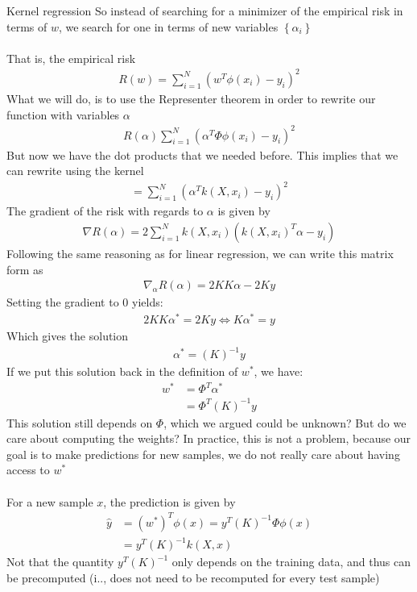 \begin{parag}{Kernel regression}
    So instead of searching for a minimizer of the empirical risk in terms of $w$, we search for one in terms of new variables $\left\{\alpha_i\right\}$\\
	$ $\\
	That is, the empirical risk
	\begin{align*} 
		R\left(w\right) = \sum_{i= 1}^{N}\left(w^{T}\phi\left(x_i\right) - y_i\right)^2
	\end{align*}
	What we will do, is to use the Representer theorem in order to rewrite our function with variables $\alpha$
	\begin{align*} 
		R\left(\alpha\right) \sum_{i= 1}^{N}\left(\alpha^{T}\Phi \phi\left(x_i\right)- y_i\right)^2
	\end{align*}
	But now we have the dot products that we needed before. This implies that we can rewrite using the kernel
	\begin{align*} 
		= \sum_{i= 1}^{N}\left(\alpha^Tk\left(X, x_i\right) - y_i\right)^2
	\end{align*}
	The gradient of the risk with regards to $\alpha$ is given by 
	\begin{align*} 
		\nabla R\left(\alpha\right) =  2 \sum_{i= 1}^{N}k\left(X, x_i\right)\left(k\left(X, x_i\right)^{T}\alpha - y_i\right)
	\end{align*}
	Following the same reasoning as for linear regression, we can write this matrix form as 
	\begin{align*} 
		\nabla_\alpha R\left(\alpha\right) = 2KK\alpha - 2Ky
	\end{align*}
	Setting the gradient to $0$ yields:
	\begin{align*} 
		2KK\alpha^{\ast} =  2Ky \iff K\alpha^{\ast} =  y
	\end{align*}
	Which gives the solution
	\begin{align*} \alpha^\ast =  \left(K\right)^{-1}y \end{align*}
	If we put this solution back in the definition of $w^{\ast}$, we have:
	\begin{align*} 
		w^{\ast} &= \Phi^{T}\alpha^\ast\\
		&= \Phi^{T}\left(K\right)^{-1} y
	\end{align*}
	This solution still depends on $\Phi$, which we argued could be unknown? But do we care about computing the weights? In practice, this is not a problem, because our goal is to make predictions for new samples, we do not really care about having access to $w^{\ast}$\\
	$ $\\
	For a new sample $x$, the prediction is given by 
	\begin{align*} 
		\hat{y} &=  \left(w^{\ast}\right)^{T}\phi\left(x\right) =  y^{T}\left(K\right)^{-1} \Phi \phi\left(x\right)\\
		&= y^{T}\left(K\right)^{-1}k\left(X, x\right)
	\end{align*}
	Not that the quantity $y^{T}\left(K\right)^{-1}$ only depends on the training data, and thus can be precomputed (i.., does not need to be recomputed for every test sample)
\end{parag}


